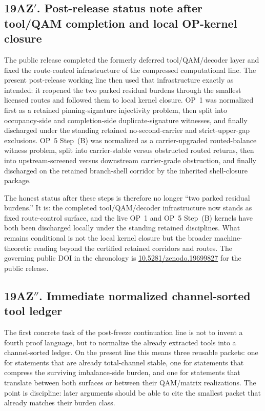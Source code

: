 \subsection*{19AZ$\prime$. Post-release status note after tool/QAM completion and local OP-kernel closure}
The public  release completed the formerly deferred tool/QAM/decoder layer and fixed the route-control infrastructure of the compressed computational line. The present post-release working line then used that infrastructure exactly as intended: it reopened the two parked residual burdens through the smallest licensed routes and followed them to local kernel closure. OP~1 was normalized first as a retained pinning-signature injectivity problem, then split into occupancy-side and completion-side duplicate-signature witnesses, and finally discharged under the standing retained no-second-carrier and strict-upper-gap exclusions. OP~5 Step~(B) was normalized as a carrier-upgraded routed-balance witness problem, split into carrier-stable versus obstructed routed returns, then into upstream-screened versus downstream carrier-grade obstruction, and finally discharged on the retained branch-shell corridor by the inherited shell-closure package.

The honest status after these steps is therefore no longer ``two parked residual burdens.'' It is: the completed tool/QAM/decoder infrastructure now stands as fixed route-control surface, and the live OP~1 and OP~5 Step~(B) kernels have both been discharged locally under the standing retained disciplines. What remains conditional is not the local kernel closure but the broader machine-theoretic reading beyond the certified retained corridors and routes. The governing public DOI in the chronology is \href{https://doi.org/10.5281/zenodo.19699827}{10.5281/zenodo.19699827} for the public  release.

\subsection*{19AZ$''$. Immediate normalized channel-sorted tool ledger}
\label{sec:immediate-normalized-tool-ledger}
The first concrete task of the post-freeze continuation line is not to invent a fourth proof language, but to normalize the already extracted tools into a channel-sorted ledger. On the present line this means three reusable packets: one for statements that are already total-channel stable, one for statements that compress the surviving imbalance-side burden, and one for statements that translate between both surfaces or between their QAM/matrix realizations. The point is discipline: later arguments should be able to cite the smallest packet that already matches their burden class.

